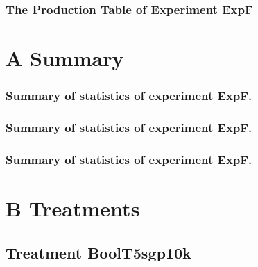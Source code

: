\documentclass[18pt,c]{beamer}
\begin{document}
 \begin{frame}
 \fontsize{8pt}{9pt}\selectfont
 \frametitle{ The Production Table of Experiment ExpF }

 \label{ExpFGrammarTable001.tex}  
 \end{frame}

\clearpage
\section{A Summary}
 \begin{frame}
 \fontsize{8pt}{9pt}\selectfont
 \frametitle{ Summary of statistics of experiment ExpF. }

 \label{ExpFStatsTable000.tex}  
 \end{frame}

 \begin{frame}
 \fontsize{8pt}{9pt}\selectfont
 \frametitle{ Summary of statistics of experiment ExpF. }

 \label{ExpFStatsTable001.tex}  
 \end{frame}

 \begin{frame}
 \fontsize{8pt}{9pt}\selectfont
 \frametitle{ Summary of statistics of experiment ExpF. }

 \label{ExpFStatsTable002.tex}  
 \end{frame}

\clearpage
\section{B Treatments}
\clearpage
\subsection{Treatment BoolT5sgp10k}
\end{document}
